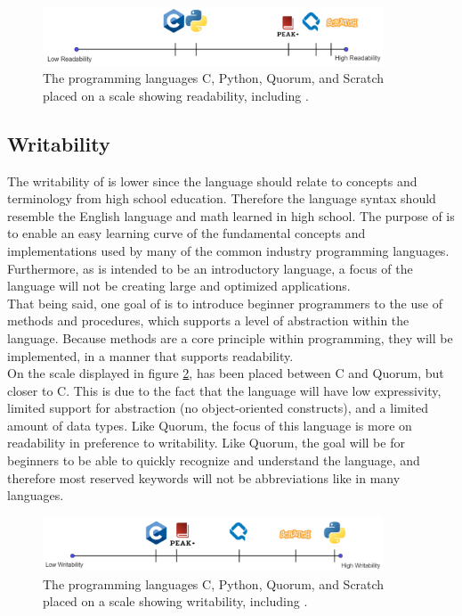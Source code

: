 \begin{figure}[H] 
    \begin{center}
        \includegraphics[width=0.9\textwidth]{Files/Billeder: Design/ReadabilityOwn.png}
    \end{center}
    \caption{The programming languages C, Python, Quorum, and Scratch placed on a scale showing readability, including \lang.}
    \label{LD:readability_scale}
\end{figure}


\subsection{Writability}
The writability of \lang is lower since the language should relate to concepts and terminology from high school education. Therefore the language syntax should resemble the English language and math learned in high school. The purpose of \lang is to enable an easy learning curve of the fundamental concepts and implementations used by many of the common industry programming languages.  Furthermore, as \lang is intended to be an introductory language, a focus of the language will not be creating large and optimized applications. \\

That being said, one goal of \lang is to introduce beginner programmers to the use of methods and procedures, which supports a level of abstraction within the language. Because methods are a core principle within programming, they will be implemented, in a manner that supports readability.\\

On the scale displayed in figure \ref{LD:Writability_Scale}, \lang has been placed between C and Quorum, but closer to C. This is due to the fact that the language will have low expressivity, limited support for abstraction (no object-oriented constructs), and a limited amount of data types. Like Quorum, the focus of this language is more on readability in preference to writability. Like Quorum, the goal will be for beginners to be able to quickly recognize and understand the language, and therefore most reserved keywords will not be abbreviations like in many languages.


\begin{figure}[H] 
    \begin{center}
        \includegraphics[width=0.9\textwidth]{Files/Billeder: Design/WritabilityOwn.png}
    \end{center}
    \caption{The programming languages C, Python, Quorum, and Scratch placed on a scale showing writability, including \lang.}
    \label{LD:Writability_Scale}
\end{figure}

